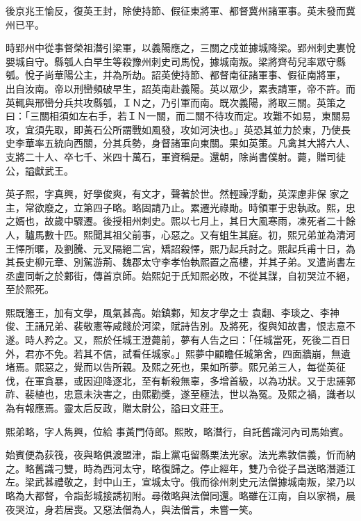 \begin{pinyinscope}
 後京兆王愉反，復英王封，除使持節、假征東將軍、都督冀州諸軍事。英未發而冀州已平。



 時郢州中從事督榮祖潛引梁軍，以義陽應之，三關之戍並據城降梁。郢州刺史婁悅嬰城自守。縣瓠人白早生等殺豫州刺史司馬悅，據城南叛。梁將齊茍兒率眾守縣瓠。悅子尚華陽公主，并為所劫。詔英使持節、都督南征諸軍事、假征南將軍，
 出自汝南。帝以刑巒頻破早生，詔英南赴義陽。英以眾少，累表請軍，帝不許。而英輒與邢巒分兵共攻縣瓠，ＩＮ之，乃引軍而南。既次義陽，將取三關。英策之曰：「三關相須如左右手，若ＩＮ一關，而二關不待攻而定。攻難不如易，東關易攻，宜須先取，即黃石公所謂戰如風發，攻如河決也。」英恐其並力於東，乃使長史李華率五統向西關，分其兵勢，身督諸軍向東關。果如英策。凡禽其大將六人、支將二十人、卒七千、米四十萬石，軍資稱是。還朝，除尚書僕射。薨，贈司徒公，謚獻武王。



 英子熙，字真興，好學俊爽，有文才，聲著於世。然輕躁浮動，英深慮非保
 家之主，常欲廢之，立第四子略。略固請乃止。累遷光祿勛。時領軍于忠執政。熙，忠之婿也，故歲中驟遷。後授相州刺史。熙以七月上，其日大風寒雨，凍死者二十餘人，驢馬數十匹。熙聞其祖父前事，心惡之。又有蛆生其庭。初，熙兄弟並為清河王懌所暱，及劉騰、元叉隔絕二宮，矯詔殺懌，熙乃起兵討之。熙起兵甫十日，為其長史柳元章、別駕游荊、魏郡太守李孝怡執熙置之高樓，并其子弟。叉遣尚書左丞盧同斬之於鄴街，傳首京師。始熙妃于氏知熙必敗，不從其謀，自初哭泣不絕，至於熙死。



 熙既籓王，加有文學，風氣甚高。始鎮鄴，知友才學之士
 袁翻、李琰之、李神俊、王誦兄弟、裴敬憲等咸餞於河梁，賦詩告別。及將死，復與知故書，恨志意不遂。時人矜之。又，熙於任城王澄薨前，夢有人告之曰：「任城當死，死後二百日外，君亦不免。若其不信，試看任城家。」熙夢中顧瞻任城第舍，四面牆崩，無遺堵焉。熙惡之，覺而以告所親。及熙之死也，果如所夢。熙兄弟三人，每從英征伐，在軍貪暴，或因迎降逐北，至有斬殺無辜，多增首級，以為功狀。又于忠誣郭祚、裴植也，忠意未決害之，由熙勸獎，遂至極法，世以為冤。及熙之禍，識者以為有報應焉。靈太后反政，贈太尉公，謚曰文莊王。



 熙弟略，字人雋興，位給
 事黃門侍郎。熙敗，略潛行，自託舊識河內司馬始賓。



 始賓便為荻筏，夜與略俱渡盟津，詣上黨屯留縣栗法光家。法光素敦信義，忻而納之。略舊識刁雙，時為西河太守，略復歸之。停止經年，雙乃令從子昌送略潛遁江左。梁武甚禮敬之，封中山王，宣城太守。俄而徐州刺史元法僧據城南叛，梁乃以略為大都督，令詣彭城接誘初附。尋徵略與法僧同還。略雖在江南，自以家禍，晨夜哭泣，身若居喪。又惡法僧為人，與法僧言，未嘗一笑。




\end{pinyinscope}
